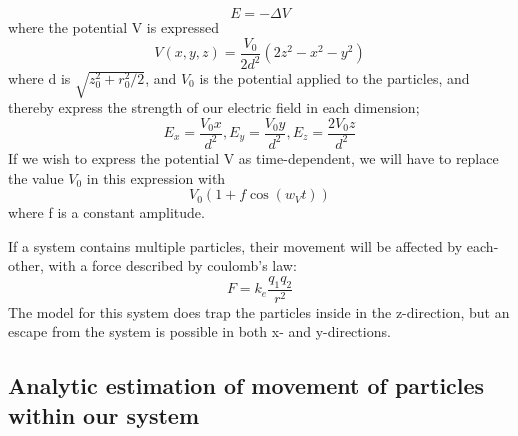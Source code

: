 \documentclass[english,notitlepage,reprint,nofootinbib,twocolumn]{article}
\begin{document}
$$E=- \Delta V$$
where the potential V is expressed 
\begin{equation}
    V(x,y,z)=\frac{V_0}{2d^2}\left(2z^2-x^2-y^2\right)
\end{equation}
where d is $\sqrt{z_0^2+r_0^2/2}$, and $V_0$ is the potential applied to the particles, and thereby express the strength of our electric field in each dimension; \\
\begin{equation}
    E_x=\frac{V_0x}{d^2}   ,   E_y=\frac{V_0y}{d^2}   ,   E_z=\frac{2V_0z}{d^2} 
\end{equation}
If we wish to express the potential V as time-dependent, we will have to replace the value $V_0$ in this expression with 
\begin{equation}
    V_0(1+f\cos{(w_Vt)})
\end{equation}
where f is a constant amplitude.

If a system contains multiple particles, their movement will be affected by each-other, with a force described by coulomb's law:
\begin{equation}
    F=k_e \frac{q_1q_2}{r^2}
\end{equation}
The model for this system does trap the particles inside in the z-direction, but an escape from the system is possible in both x- and y-directions. 

 

\subsection{Analytic estimation of movement of particles within our system}
\end{document}
